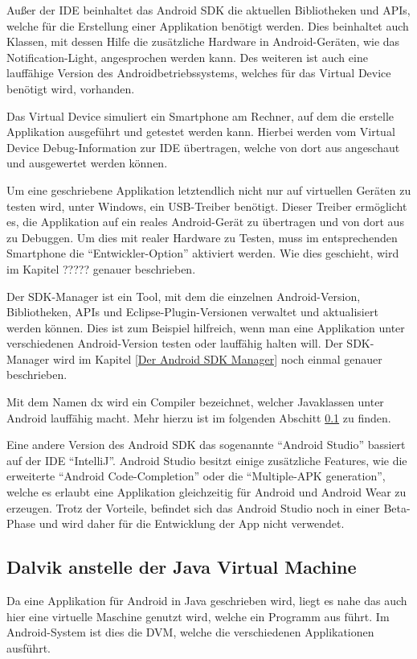 Au\ss{}er der \ac{IDE} beinhaltet das Android \ac{SDK} die aktuellen Bibliotheken und APIs, welche f\"ur die Erstellung einer Applikation ben\"otigt werden. Dies beinhaltet auch Klassen, mit dessen Hilfe die zus\"atzliche Hardware in Android-Ger\"aten, wie das Notification-Light, angesprochen werden kann. Des weiteren ist auch eine lauff\"ahige Version des Androidbetriebssystems, welches f\"ur das Virtual Device ben\"otigt wird, vorhanden.

Das Virtual Device simuliert ein Smartphone am Rechner, auf dem die erstelle Applikation ausgef\"uhrt und getestet werden kann. Hierbei werden vom Virtual Device Debug-Information zur \ac{IDE} \"ubertragen, welche von dort aus angeschaut und ausgewertet werden k\"onnen.

Um eine geschriebene Applikation letztendlich nicht nur auf virtuellen Ger\"aten zu testen wird, unter Windows, ein USB-Treiber ben\"otigt. Dieser Treiber erm\"oglicht es, die Applikation auf ein reales Android-Ger\"at zu \"ubertragen und von dort aus zu Debuggen.
Um dies mit realer Hardware zu Testen, muss im entsprechenden Smartphone die "`Entwickler-Option"' aktiviert werden. Wie dies geschieht, wird im Kapitel ????? genauer beschrieben.

Der SDK-Manager ist ein Tool, mit dem die einzelnen Android-Version, Bibliotheken, APIs und Eclipse-Plugin-Versionen verwaltet und aktualisiert werden k\"onnen. Dies ist zum Beispiel hilfreich, wenn man eine Applikation unter verschiedenen Android-Version testen oder lauff\"ahig halten will. Der SDK-Manager wird im Kapitel \ref{Der Android SDK Manager} noch einmal genauer beschrieben.

Mit dem Namen dx wird ein Compiler bezeichnet, welcher Javaklassen unter Android lauff\"ahig macht. Mehr hierzu ist im folgenden Abschitt \ref{Dalvik anstelle der Java Virtual Machine} zu finden.

Eine andere Version des Android \ac{SDK} das sogenannte "`Android Studio"' bassiert auf der \ac{IDE} "`IntelliJ"'. Android Studio besitzt einige zus\"atzliche Features, wie die erweiterte "`Android Code-Completion"' oder die "`Multiple-APK generation"', welche es erlaubt eine Applikation gleichzeitig f\"ur Android und Android Wear zu erzeugen. Trotz der Vorteile, befindet sich das Android Studio noch in einer Beta-Phase und wird daher f\"ur die Entwicklung der App nicht verwendet. \cite{DevAndroidStudio}

\subsection{Dalvik anstelle der Java Virtual Machine} \label{Dalvik anstelle der Java Virtual Machine}
Da eine Applikation f\"ur Android in Java geschrieben wird, liegt es nahe das auch hier eine virtuelle Maschine genutzt wird, welche ein Programm aus f\"uhrt. Im Android-System ist dies die \ac{DVM}, welche die verschiedenen Applikationen ausf\"uhrt. \cite{Android44}

